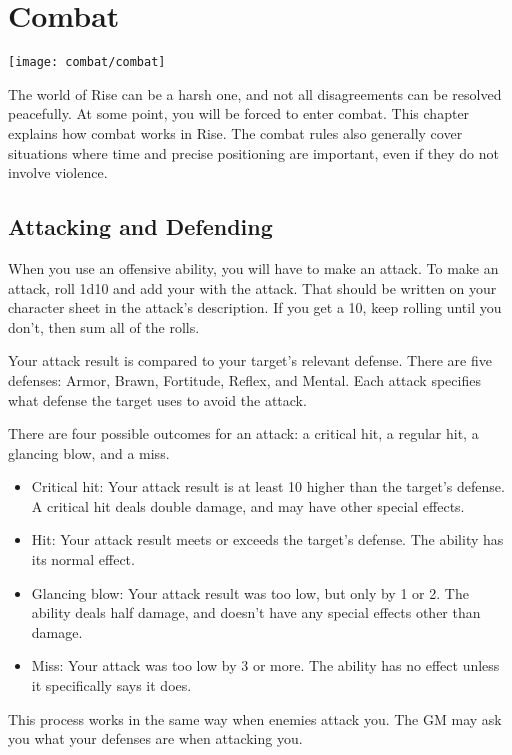 \chapter{Combat}\label{Combat}
\texttt{[image: combat/combat]}

The world of Rise can be a harsh one, and not all disagreements can be resolved peacefully.
At some point, you will be forced to enter combat.
This chapter explains how combat works in Rise.
The combat rules also generally cover situations where time and precise positioning are important, even if they do not involve violence.

\section{Attacking and Defending}
  When you use an offensive ability, you will have to make an attack.
  To make an attack, roll 1d10 and add your  with the attack.
  That should be written on your character sheet in the attack's description.
  If you get a 10, keep rolling until you don't, then sum all of the rolls.

  Your attack result is compared to your target's relevant defense.
  There are five defenses: Armor, Brawn, Fortitude, Reflex, and Mental.
  Each attack specifies what defense the target uses to avoid the attack.

  There are four possible outcomes for an attack: a critical hit, a regular hit, a glancing blow, and a miss.
  \begin{itemize}
    \item Critical hit: Your attack result is at least 10 higher than the target's defense.
      A critical hit deals double damage, and may have other special effects.
    \item Hit: Your attack result meets or exceeds the target's defense.
      The ability has its normal effect.
    \item Glancing blow: Your attack result was too low, but only by 1 or 2.
      The ability deals half damage, and doesn't have any special effects other than damage.
    \item Miss: Your attack was too low by 3 or more.
      The ability has no effect unless it specifically says it does.
  \end{itemize}

  This process works in the same way when enemies attack you.
  The GM may ask you what your defenses are when attacking you.

